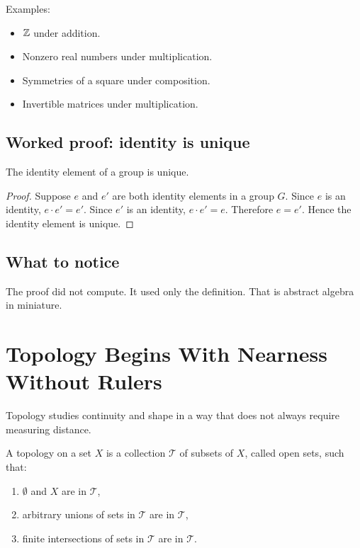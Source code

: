 \documentclass[11pt]{article}
\begin{document}
Examples:

\begin{itemize}
\item $\mathbb{Z}$ under addition.
\item Nonzero real numbers under multiplication.
\item Symmetries of a square under composition.
\item Invertible matrices under multiplication.
\end{itemize}

\subsection{Worked proof: identity is unique}

\begin{theorem}
The identity element of a group is unique.
\end{theorem}

\begin{proof}
Suppose $e$ and $e'$ are both identity elements in a group $G$. Since $e$ is an identity, $e\cdot e'=e'$. Since $e'$ is an identity, $e\cdot e'=e$. Therefore $e=e'$. Hence the identity element is unique.
\end{proof}

\subsection{What to notice}

The proof did not compute. It used only the definition. That is abstract algebra in miniature.

\newpage
\section{Topology Begins With Nearness Without Rulers}

Topology studies continuity and shape in a way that does not always require measuring distance.

\begin{definition}
A topology on a set $X$ is a collection $\mathcal{T}$ of subsets of $X$, called open sets, such that:
\begin{enumerate}
\item $\emptyset$ and $X$ are in $\mathcal{T}$,
\item arbitrary unions of sets in $\mathcal{T}$ are in $\mathcal{T}$,
\item finite intersections of sets in $\mathcal{T}$ are in $\mathcal{T}$.
\end{enumerate}
\end{definition}
\end{document}
